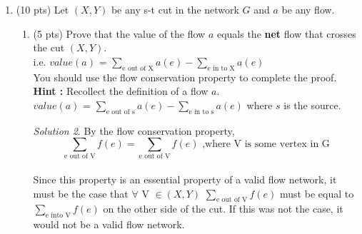 \documentclass[12pt]{article}
\theoremstyle{remark}
\newtheorem*{solution}{Solution}
\begin{document}
\begin{enumerate}
\begin{enumerate}
\item (4 pts) Find the minimum capacity cut with respect to the capacities on the original graph. Is this minimum capacity equal to the Max-Flow that you earlier identified? Justify your answer in a sentence. Also, report the crossing edges in this cut that are saturated (can't carry any more flow).
\begin{solution}
Min Cut: \\ 
The min cut would divde the graph into two disjoint sets: A = \{s\}, B = \{a,b,c,d,t\} \\ This is the min cut because there is no other cut you can make in the graph, other than the same cut to separate t, that is less than 20. In this min cut, the edge s-a is saturated.
\end{solution}

\end{enumerate}
\pagebreak

\item (10 pts) Let $(X, Y)$ be any s-t cut in the network $G$ and $a$ be any flow. \begin{enumerate}
    \item (5 pts) Prove that the value of the flow $a$ equals the \textbf{net} flow that crosses the cut $(X, Y)$. \\
    i.e. $value(a)$ = $\sum\limits_{\text{e out of X}}^{}a(e) - \sum\limits_{\text{e in to X}}^{}a(e)$\\	You should use the flow conservation property to complete the proof. \\
    \textbf{Hint :} Recollect the definition of a flow $a$.\\
    $value(a)$ = $\sum\limits_{\text{e out of s}}^{}a(e) - \sum\limits_{\text{e in to s}}^{}a(e)$ where $s$ is the source.
    
    
\begin{solution}
By the flow conservation property, $$\sum_{\text{e out of V}} f(e) = \sum_{\text{e out of V}} f(e) \text{  ,where V is some vertex in G}$$ \\
Since this property is an essential property of a valid flow network, it must be the case that $\forall$  V $\in (X,Y)$ $\sum_{\text{e out of V}} f(e)$ must be equal to $\sum_{\text{e into V}} f(e)$ on the other side of the cut. If this was not the case, it would not be a valid flow network.
\end{solution}


\end{enumerate}
\end{enumerate}
\end{document}
